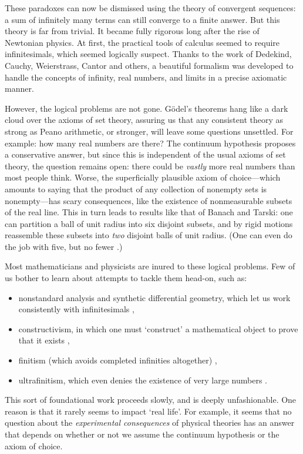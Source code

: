 \documentclass[12pt]{article}
\begin{document}
These paradoxes can now be dismissed using the theory of convergent sequences:
a sum of infinitely many terms can still converge to a finite answer.  But this theory is far from trivial.  It became fully rigorous long after the rise of Newtonian physics.  At first, the practical tools of calculus seemed to require infinitesimals, which seemed logically suspect.  Thanks to the work of Dedekind, Cauchy, Weierstrass, Cantor and others, a beautiful formalism was developed to handle the concepts of infinity, real numbers, and limits in a precise axiomatic manner. 

However, the logical problems are not gone.  G\"odel's theorems hang like  a dark cloud over the axioms of set theory, assuring us that any consistent theory as strong as Peano arithmetic, or stronger, will leave some questions unsettled.  For example: how many real numbers are there?   The continuum hypothesis proposes a conservative answer, but since this is independent of the usual axioms of set theory, the question remains open: there could be \emph{vastly} more real numbers than most people think.  Worse, the superficially plausible axiom of choice---which amounts to saying that the product of  any collection of nonempty sets is nonempty---has scary consequences, like the existence of nonmeasurable subsets of the real line.  This in turn leads to results like that of
Banach and Tarski: one can partition a ball of unit radius into six disjoint subsets, and by rigid motions reassemble  these subsets into {\it two} disjoint balls of unit radius.  
(One can even do the job with five, but no fewer \cite{Wagon}.)

Most mathematicians and physicists are inured to these logical problems.  Few of us bother to learn about attempts to tackle them head-on, such as:
\begin{itemize}
\item nonstandard analysis and synthetic differential geometry, which let us work consistently with infinitesimals \cite{Kock1,Kock2,LoebWolff,Robinson},
\item constructivism, in which one must `construct' a mathematical object to prove that it exists \cite{Bishop},
\item  finitism (which avoids completed infinities altogether) \cite{Ye},
\item ultrafinitism, which even denies the existence of very large numbers \cite{Boucher}.
\end{itemize}
This sort of foundational work proceeds slowly, and is deeply unfashionable.  One reason is that 
it rarely seems to impact `real life'.   For example, it seems that no question about the \emph{experimental consequences} of physical theories has an answer that depends on whether 
or not we assume the continuum hypothesis or the axiom of choice.  
\end{document}
